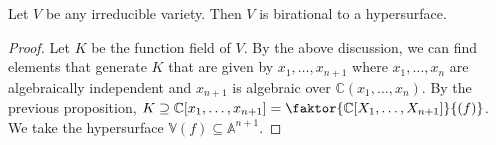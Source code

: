 \begin{corollary}
    Let \( V \) be any irreducible variety.
    Then \( V \) is birational to a hypersurface.
\end{corollary}
\begin{proof}
    Let \( K \) be the function field of \( V \).
    By the above discussion, we can find elements that generate \( K \) that are given by \( x_1, \dots, x_{n+1} \) where \( x_1, \dots, x_n \) are algebraically independent and \( x_{n+1} \) is algebraic over \( \mathbb C(x_1, \dots, x_n) \).
    By the previous proposition, \( K \supseteq \mathbb C[x_1, \dots, x_{n+1}] = \faktor{\mathbb C[X_1, \dots, X_{n+1}]}{(f)} \).
    We take the hypersurface \( \mathbb V(f) \subseteq \mathbb A^{n+1} \).
\end{proof}

